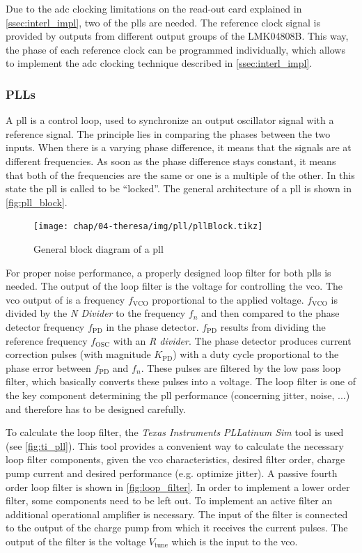 Due to the \gls{adc} clocking limitations on the read-out card explained in \autoref{ssec:interl_impl}, two of the \glspl{pll} are needed. 
The reference clock signal is provided by outputs from different output groups of the LMK04808B. This way, the phase of each reference clock can be programmed individually, which allows to implement the \gls{adc} clocking technique described in \autoref{ssec:interl_impl}.


\subsubsection*{PLLs}
A \gls{pll} is a control loop, used to synchronize an output oscillator signal with a reference signal.
The principle lies in comparing the phases between the two inputs. 
When there is a varying phase difference, it means that the signals are at different frequencies.
As soon as the phase difference stays constant, it means that both of the frequencies are the same or one is a multiple of the other. 
In this state the \gls{pll} is called to be ``locked''.
The general architecture of a \gls{pll} is shown in \autoref{fig:pll_block}.

\begin{figure}[tb]
	\centering
	\texttt{[image: chap/04-theresa/img/pll/pllBlock.tikz]}
	\caption[PLL block diagram]{General block diagram of a \gls{pll} \cite{pll_design}}
	\label{fig:pll_block}
\end{figure}

For proper noise performance, a properly designed loop filter for both \glspl{pll} is needed. 
The output of the loop filter is the voltage for controlling the \gls{vco}.
The \gls{vco} output of is a frequency $f_\text{VCO}$ proportional to the applied voltage.
$f_\text{VCO}$ is divided by the \textit{N Divider} to the frequency $f_n$ and then compared to the phase detector frequency $f_\text{PD}$ in the phase detector. 
$f_\text{PD}$ results from dividing the reference frequency $f_\text{OSC}$ with an \textit{R divider}. 
The phase detector produces current correction pulses (with magnitude $K_\text{PD}$) with a duty cycle proportional to the phase error between $f_\text{PD}$ and $f_n$. 
These pulses are filtered by the low pass loop filter, which basically converts these pulses into a voltage. \cite{pll_design}
The loop filter is one of the key component determining the \gls{pll} performance (concerning jitter, noise, ...) and therefore has to be designed carefully.

To calculate the loop filter, the \textit{Texas Instruments} \textit{PLLatinum Sim} tool is used (see \autoref{fig:ti_pll}). 
This tool provides a convenient way to calculate the necessary loop filter components, given the \gls{vco} characteristics, desired filter order, charge pump current and desired performance (e.g. optimize jitter). 
A passive fourth order loop filter is shown in \autoref{fig:loop_filter}.
In order to implement a lower order filter, some components need to be left out.
To implement an active filter an additional operational amplifier is necessary.
The input of the filter is connected to the output of the charge pump from which it receives the current pulses.
The output of the filter is the voltage $V_\text{tune}$ which is the input to the \gls{vco}.


